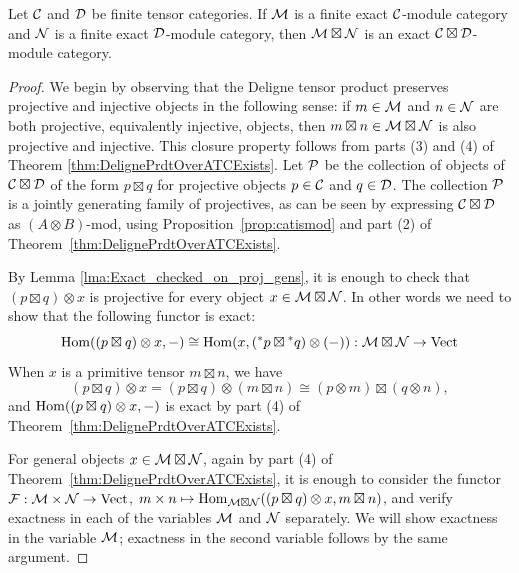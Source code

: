 \documentclass{amsart}
\begin{document}
\begin{theorem}\label{thm:tensor-exactness}
Let $\mathcal C$ and $\mathcal D$ be finite tensor categories.  If $\mathcal M$ is a finite exact $\mathcal C$-module category and $\mathcal N$ is a finite exact $\mathcal D$-module category, then $\mathcal M \boxtimes \mathcal N$ is an exact $\mathcal C \boxtimes \mathcal D$-module category.
\end{theorem} %
\begin{proof}  
We begin by observing that the Deligne tensor product preserves projective and injective objects in the following sense: if $m \in \mathcal M$ and $n \in \mathcal N$ are both projective, equivalently injective, objects, then $m \boxtimes n \in \mathcal M \boxtimes \mathcal N$ is also projective and injective. This closure property follows from parts (3) and (4) of Theorem \ref{thm:DelignePrdtOverATCExists}. Let $\mathcal P$ be the collection of objects of $\mathcal C \boxtimes \mathcal D$ of the form $p \boxtimes q$ for projective objects $p \in \mathcal C$ and $q \in \mathcal D$. The collection $\mathcal P$ is a jointly generating family of projectives, as can be seen by expressing $\mathcal C \boxtimes \mathcal D$ as $(A \otimes B)\textrm{-}\mathrm{mod}$, using Proposition~\ref{prop:catismod} and part (2) of Theorem~\ref{thm:DelignePrdtOverATCExists}. 

By Lemma \ref{lma:Exact_checked_on_proj_gens}, it is enough to check that $(p \boxtimes q) \otimes x$ is projective for every object $x \in \mathcal M \boxtimes \mathcal N$. In other words we need to show that the following functor is exact:
\begin{equation*}
	\operatorname{Hom}((p \boxtimes q) \otimes x, -) \cong \operatorname{Hom}(x, ({}^*p \boxtimes {}^*q) \otimes(-) ): \mathcal M \boxtimes \mathcal N \to \mathrm{Vect}
\end{equation*}
When $x$ is a primitive tensor $m \boxtimes n$, we have
\begin{equation*}
	(p \boxtimes q) \otimes x = (p \boxtimes q) \otimes (m \boxtimes n) \cong (p \otimes m) \boxtimes (q \otimes n),
\end{equation*}
and $\operatorname{Hom}((p \boxtimes q) \otimes x,-)$ is exact by part (4) of Theorem~\ref{thm:DelignePrdtOverATCExists}.

For general objects $x \in \mathcal M \boxtimes \mathcal N$, again by part (4) of Theorem~\ref{thm:DelignePrdtOverATCExists}, it is enough to consider the functor $\mathcal F: \mathcal M \times \mathcal N \rightarrow \mathrm{Vect}$, $m \times n \mapsto \operatorname{Hom}_{\mathcal M \boxtimes \mathcal N}((p \boxtimes q) \otimes x, m \boxtimes n)$, and verify exactness in each of the variables $\mathcal M$ and $\mathcal N$ separately. We will show exactness in the variable $\mathcal M$; exactness in the second variable follows by the same argument. 


\end{proof}
\end{document}
